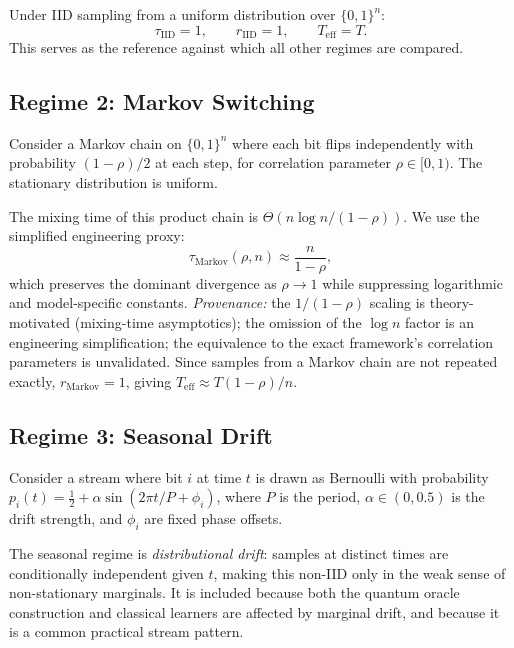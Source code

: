 \documentclass[preprint,12pt,authoryear]{elsarticle}
\newcommand{\Teff}{T_{\mathrm{eff}}}
\begin{document}
Under IID sampling from a uniform distribution over $\{0,1\}^n$:
\begin{equation}
    \tau_{\text{IID}} = 1, \qquad r_{\text{IID}} = 1, \qquad \Teff = T.
\end{equation}
This serves as the reference against which all other regimes are compared.

\subsection{Regime 2: Markov Switching}

Consider a Markov chain on $\{0,1\}^n$ where each bit flips independently with probability $(1 - \rho)/2$ at each step, for correlation parameter $\rho \in [0, 1)$. The stationary distribution is uniform.

The mixing time of this product chain is $\Theta(n \log n / (1 - \rho))$. We use the simplified engineering proxy:
\begin{equation}
    \tau_{\text{Markov}}(\rho, n) \approx \frac{n}{1 - \rho},
    \label{eq:tau_markov}
\end{equation}
which preserves the dominant divergence as $\rho \to 1$ while suppressing logarithmic and model-specific constants. \emph{Provenance:} the $1/(1{-}\rho)$ scaling is theory-motivated (mixing-time asymptotics); the omission of the $\log n$ factor is an engineering simplification; the equivalence to the exact framework's correlation parameters is unvalidated. Since samples from a Markov chain are not repeated exactly, $r_{\text{Markov}} = 1$, giving $\Teff \approx T(1{-}\rho)/n$.

\subsection{Regime 3: Seasonal Drift}

Consider a stream where bit $i$ at time $t$ is drawn as Bernoulli with probability $p_i(t) = \tfrac{1}{2} + \alpha \sin(2\pi t/P + \phi_i)$, where $P$ is the period, $\alpha \in (0, 0.5)$ is the drift strength, and $\phi_i$ are fixed phase offsets.

The seasonal regime is \emph{distributional drift}: samples at distinct times are conditionally independent given $t$, making this non\nobreakdash-IID only in the weak sense of non-stationary marginals. It is included because both the quantum oracle construction and classical learners are affected by marginal drift, and because it is a common practical stream pattern.
\end{document}
